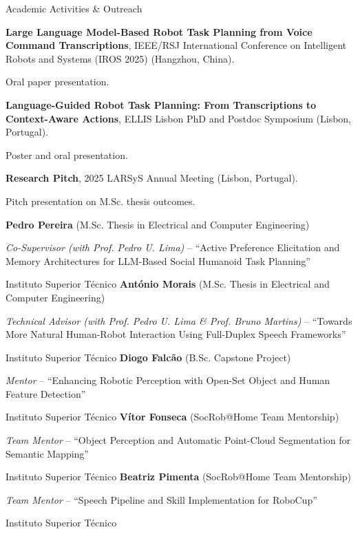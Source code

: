 \begin{rubric}{Academic Activities \& Outreach}

\entry*[Oct 2025]
	\textbf{Large Language Model-Based Robot Task Planning from Voice Command Transcriptions}, IEEE/RSJ International Conference on Intelligent Robots and Systems (IROS 2025) (Hangzhou, China).
	\par
	\small Oral paper presentation.

\entry*[Oct 2025]
	\textbf{Language-Guided Robot Task Planning: From Transcriptions to Context-Aware Actions}, ELLIS Lisbon PhD and Postdoc Symposium (Lisbon, Portugal).
	\par
	\small Poster and oral presentation.

\entry*[Jul 2025]
	\textbf{Research Pitch}, 2025 LARSyS Annual Meeting (Lisbon, Portugal).
	\par
	\small Pitch presentation on M.Sc. thesis outcomes.


\entry*[2026 -- Present]%
  \textbf{Pedro Pereira } (M.Sc. Thesis in Electrical and Computer Engineering) \par
  \textit{Co-Supervisor (with Prof. Pedro U. Lima) } -- ``Active Preference Elicitation and Memory Architectures for LLM-Based Social Humanoid Task Planning'' \par
  \small Instituto Superior Técnico%
\entry*[2025 -- Present]%
  \textbf{António Morais } (M.Sc. Thesis in Electrical and Computer Engineering) \par
  \textit{Technical Advisor (with Prof. Pedro U. Lima \& Prof. Bruno Martins) } -- ``Towards More Natural Human-Robot Interaction Using Full-Duplex Speech Frameworks'' \par
  \small Instituto Superior Técnico%
\entry*[2025]%
  \textbf{Diogo Falcão } (B.Sc. Capstone Project) \par
  \textit{Mentor } -- ``Enhancing Robotic Perception with Open-Set Object and Human Feature Detection'' \par
  \small Instituto Superior Técnico%
\entry*[2025 -- Present]%
  \textbf{Vítor Fonseca } (SocRob@Home Team Mentorship) \par
  \textit{Team Mentor } -- ``Object Perception and Automatic Point-Cloud Segmentation for Semantic Mapping'' \par
  \small Instituto Superior Técnico%
\entry*[2025 -- Present]%
  \textbf{Beatriz Pimenta } (SocRob@Home Team Mentorship) \par
  \textit{Team Mentor } -- ``Speech Pipeline and Skill Implementation for RoboCup'' \par
  \small Instituto Superior Técnico%


\end{rubric}
